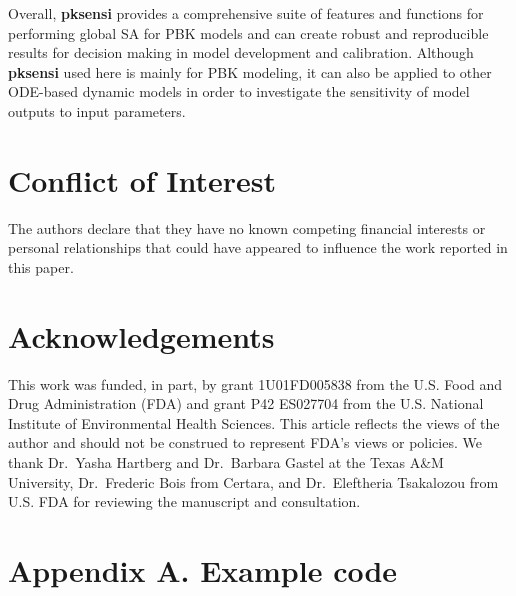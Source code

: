 \documentclass[preprint,12pt, a4paper]{elsarticle}
\begin{document}
Overall, \textbf{pksensi} provides a comprehensive suite of features and functions for performing global SA for PBK models and can create robust and reproducible results for decision making in model development and calibration. Although \textbf{pksensi} used here is mainly for PBK modeling, it can also be applied to other ODE-based dynamic models in order to investigate the sensitivity of model outputs to input parameters.

\section*{Conflict of Interest}

The authors declare that they have no known competing financial interests or personal relationships that could have appeared to influence the work reported in this paper.

\section*{Acknowledgements}

This work was funded, in part, by grant 1U01FD005838 from the U.S. Food and Drug Administration (FDA) and grant P42 ES027704 from the U.S. National Institute of Environmental Health Sciences. This article reflects the views of the author and should not be construed to represent FDA's views or policies. We thank Dr.~Yasha Hartberg and Dr.~Barbara Gastel at the Texas A\&M University, Dr.~Frederic Bois from Certara, and Dr.~Eleftheria Tsakalozou from U.S. FDA for reviewing the manuscript and consultation.


\appendix
\section*{Appendix A. Example code}
\end{document}
